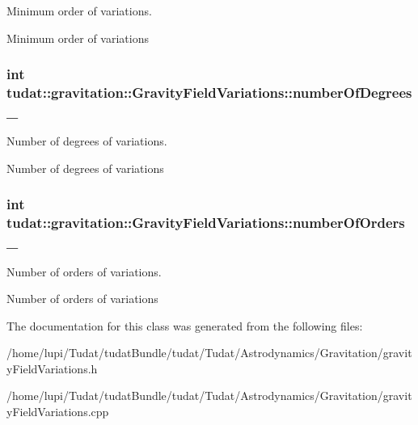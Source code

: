 Minimum order of variations. 

Minimum order of variations 
\subsubsection[{\texorpdfstring{number\+Of\+Degrees\+\_\+}{numberOfDegrees_}}]{\setlength{\rightskip}{0pt plus 5cm}int tudat\+::gravitation\+::\+Gravity\+Field\+Variations\+::number\+Of\+Degrees\+\_\+\hspace{0.3cm}{\ttfamily [protected]}}\hypertarget{classtudat_1_1gravitation_1_1GravityFieldVariations_a236edca529bfd6895123089bcfaf883d}{}\label{classtudat_1_1gravitation_1_1GravityFieldVariations_a236edca529bfd6895123089bcfaf883d}


Number of degrees of variations. 

Number of degrees of variations 
\subsubsection[{\texorpdfstring{number\+Of\+Orders\+\_\+}{numberOfOrders_}}]{\setlength{\rightskip}{0pt plus 5cm}int tudat\+::gravitation\+::\+Gravity\+Field\+Variations\+::number\+Of\+Orders\+\_\+\hspace{0.3cm}{\ttfamily [protected]}}\hypertarget{classtudat_1_1gravitation_1_1GravityFieldVariations_a8235f01b085cb96035fb7473526e938b}{}\label{classtudat_1_1gravitation_1_1GravityFieldVariations_a8235f01b085cb96035fb7473526e938b}


Number of orders of variations. 

Number of orders of variations 

The documentation for this class was generated from the following files\+:\begin{DoxyCompactItemize}
\item 
/home/lupi/\+Tudat/tudat\+Bundle/tudat/\+Tudat/\+Astrodynamics/\+Gravitation/gravity\+Field\+Variations.\+h\item 
/home/lupi/\+Tudat/tudat\+Bundle/tudat/\+Tudat/\+Astrodynamics/\+Gravitation/gravity\+Field\+Variations.\+cpp\end{DoxyCompactItemize}
